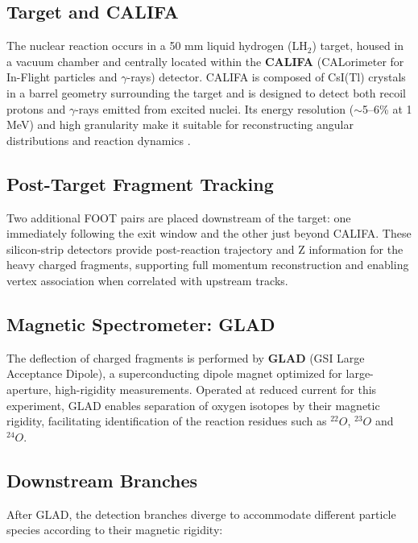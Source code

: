 \subsection{Target and CALIFA}

The nuclear reaction occurs in a 50 mm liquid hydrogen (LH$_2$) target, housed in a vacuum chamber and centrally located within the \textbf{CALIFA} (CALorimeter for In-Flight particles and $\gamma$-rays) detector. CALIFA is composed of CsI(Tl) crystals in a barrel geometry surrounding the target and is designed to detect both recoil protons and $\gamma$-rays emitted from excited nuclei. Its energy resolution ($\sim$5–6\% at 1 MeV) and high granularity make it suitable for reconstructing angular distributions and reaction dynamics \cite{cortina-gil_califa_2014}.

\subsection{Post-Target Fragment Tracking}

Two additional FOOT pairs are placed downstream of the target: one immediately following the exit window and the other just beyond CALIFA. These silicon-strip detectors provide post-reaction trajectory and Z information for the heavy charged fragments, supporting full momentum reconstruction and enabling vertex association when correlated with upstream tracks.


\subsection{Magnetic Spectrometer: GLAD}

The deflection of charged fragments is performed by \textbf{GLAD} (GSI Large Acceptance Dipole), a superconducting dipole magnet optimized for large-aperture, high-rigidity measurements. Operated at reduced current for this experiment, GLAD enables separation of oxygen isotopes by their magnetic rigidity, facilitating identification of the reaction residues such as $^{22}O$, $^{23}O$ and $^{24}O$.

\subsection{Downstream Branches}

After GLAD, the detection branches diverge to accommodate different particle species according to their magnetic rigidity:

